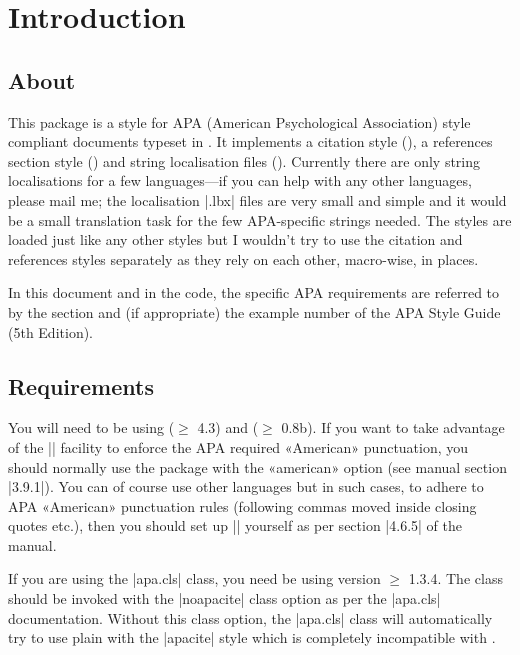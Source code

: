 \documentclass{ltxdockit}
\begin{document}
\printtitlepage
\tableofcontents

\section{Introduction}
\label{int}

\subsection{About}

This package is a  style for APA (American Psychological
Association) style compliant documents typeset in \latex. It implements a
citation style (), a references section style
() and string localisation files ().
Currently there are only string localisations for a few languages---if you can help with any other languages, please mail me; the
localisation |.lbx| files are very small and simple and it would be a small
translation task for the few APA-specific strings needed.
The styles are loaded just like any other  styles but I
wouldn't try to use the citation and references styles separately as they
rely on each other, macro-wise, in places.

In this document and in the code, the specific APA requirements are
referred to by the section and (if appropriate) the example number of the
APA Style Guide (5th Edition).

\subsection{Requirements}\label{ref:req}

You will need to be using  ($\geq$ 4.3) and 
($\geq$ 0.8b). If you want to take advantage of the 
|\DeclareQuotePunctuation| facility to enforce the APA required «American»
punctuation, you should normally use the  package with the «american»
option (see  manual section |3.9.1|). You can of course use
other languages but in such cases, to adhere to APA «American» punctuation
rules (following commas moved inside closing quotes etc.), then you should
set up |\DeclareQuotePunctuation| yourself as per section |4.6.5| of the
 manual.

If you are using the |apa.cls| \latex class, you need be using version
$\geq$ 1.3.4. The class should be invoked with the |noapacite| class option
as per the |apa.cls| documentation. Without this class option, the
|apa.cls| class will automatically try to use plain \bibtex with the
|apacite| style which is completely incompatible with .
\end{document}
